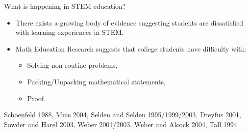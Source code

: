 \documentclass[10pt]{beamer}
\begin{document}
\begin{frame}

\begin{block}{What is happening in STEM education?}
\begin{itemize}
\item There exists a growing body of evidence suggesting students are dissatisfied with learning experiences in STEM.
\item Math Education Research suggests that college students have difficulty with:
    \begin{itemize}\normalsize
    \item Solving non-routine problems,
    \item Packing/Unpacking mathematical statements,
    \item Proof.
    \end{itemize}
\end{itemize}

\vspace{1em}

Schoenfeld 1988, Muis 2004, Selden and Selden 1995/1999/2003, Dreyfus 2001, Sowder and Harel 2003, Weber 2001/2003, Weber and Alcock 2004, Tall 1994

\end{block}

\end{frame}

\end{document}
